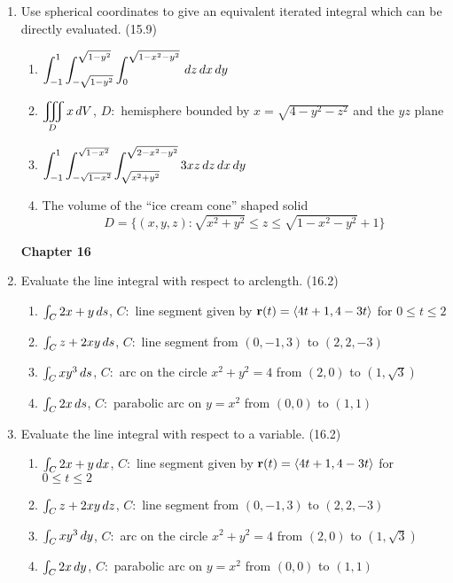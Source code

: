\begin{enumerate}
    \item Use spherical coordinates to give an equivalent iterated integral which can be directly evaluated. (15.9)

      \begin{enumerate}
        \item $\displaystyle\int_{-1}^1\int_{-\sqrt{1-y^2}}^{\sqrt{1-y^2}}\int_0^{\sqrt{1-x^2-y^2}} \,d{z}\,d{x}\,d{y}$
        \item $\displaystyle\iiint_D x\,d{V}$, $D:$ hemisphere bounded by $x=\sqrt{4-y^2-z^2}$ and the $yz$ plane
        \item $\displaystyle\int_{-1}^{1}\int_{-\sqrt{1-x^2}}^{\sqrt{1-x^2}}\int_{\sqrt{x^2+y^2}}^{\sqrt{2-x^2-y^2}}3xz\,d{z}\,d{x}\,d{y}$
        \item The volume of the ``ice cream cone'' shaped solid \[D = \{(x,y,z): \sqrt{x^2+y^2} \leq z\leq \sqrt{1-x^2-y^2}+1\}\]
      \end{enumerate}

  \newpage
  \centerline{\bf Chapter 16}

    \item Evaluate the line integral with respect to arclength. (16.2)

      \begin{enumerate}
        \item $\int_C 2x+y\,d{s}$, $C:$ line segment given by $\mathbf{r}(t)=\left<4t+1,4-3t\right>$ for $0\leq t\leq 2$
        \item $\int_C z + 2xy\,d{s}$, $C:$ line segment from $(0,-1,3)$ to $(2,2,-3)$
        \item $\int_C xy^3\,d{s}$, $C:$ arc on the circle $x^2+y^2=4$ from $(2,0)$ to $(1,\sqrt{3})$
        \item $\int_C 2x\,d{s}$, $C:$ parabolic arc on $y=x^2$ from $(0,0)$ to $(1,1)$
      \end{enumerate}

    \item Evaluate the line integral with respect to a variable. (16.2)

      \begin{enumerate}
        \item $\int_C 2x+y\,d{x}$, $C:$ line segment given by $\mathbf{r}(t)=\left<4t+1,4-3t\right>$ for $0\leq t\leq 2$
        \item $\int_C z + 2xy\,d{z}$, $C:$ line segment from $(0,-1,3)$ to $(2,2,-3)$
        \item $\int_C xy^3\,d{y}$, $C:$ arc on the circle $x^2+y^2=4$ from $(2,0)$ to $(1,\sqrt{3})$
        \item $\int_C 2x\,d{y}$, $C:$ parabolic arc on $y=x^2$ from $(0,0)$ to $(1,1)$
      \end{enumerate}


\end{enumerate}
